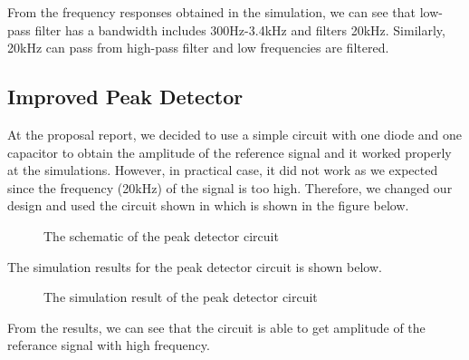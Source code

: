 \documentclass[conference]{IEEEtran}
\begin{document}
From the frequency responses obtained in the simulation, we can see that low-pass filter has a bandwidth includes 300Hz-3.4kHz and filters 20kHz. 
Similarly, 20kHz can pass from high-pass filter and low frequencies are filtered. 

\subsection{Improved Peak Detector}
At the proposal report, we decided to use a simple circuit with one diode and one capacitor to obtain the amplitude 
of the reference signal and it worked properly at the simulations. However, in practical case, it did not work as we expected 
since the frequency (20kHz) of the signal is too high. Therefore, we changed our design and used the circuit shown in \cite{peak} which is 
shown in the figure below.
\begin{figure}[H]
   \centerline{}
    \caption{The schematic of the peak detector circuit}
\end{figure}

The simulation results for the peak detector circuit is shown below.
\begin{figure}[H]
   \centerline{}
    \caption{The simulation result of the peak detector circuit}
\end{figure}

From the results, we can see that the circuit is able to get amplitude of the referance signal with high frequency.
\end{document}
